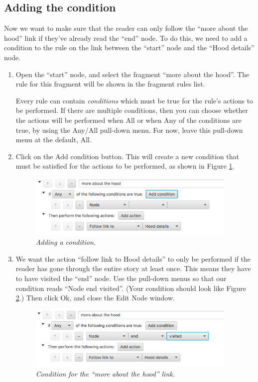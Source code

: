 \documentclass{article}
\begin{document}
\subsection{Adding the condition}

Now we want to make sure that the reader can only follow the ``more about the
hood'' link if they've already read the ``end'' node. To do this, we need to
add a condition to the rule on the link between the ``start'' node and the
``Hood details'' node.

\begin{enumerate}
  \item Open the ``start'' node, and select the fragment ``more about the
  hood''. The rule for this fragment will be shown in the fragment rules list.

Every rule can contain \textit{conditions} which must be true for the rule's actions to be performed. If there are multiple conditions, then you can choose whether the actions will be performed when All or when Any of the conditions are true, by using the Any/All pull-down menu. For now, leave this pull-down menu at the default, All.

\item Click on the Add condition button. This will create a new condition that must be satisfied for the actions to be performed, as shown in Figure \ref{fig:tut1:adding_condition}.
 
\begin{figure}[ht]
  \centering
  \includegraphics[width=10cm]{images/hypedyn-tutorial-1-figure-13}
  \caption{\textit{Adding a condition.}}
  \label{fig:tut1:adding_condition}
\end{figure} 

\item We want the action ``follow link to Hood details'' to only be performed if the reader has gone through the entire story at least once. This means they have to have visited the ``end'' node. Use the pull-down menus so that our condition reads ``Node end visited''. (Your condition should look like Figure \ref{fig:tut1:condition_hood_details}.) Then click Ok, and close the Edit Node window.

\begin{figure}[ht]
  \centering
  \includegraphics[width=10cm]{images/hypedyn-tutorial-1-figure-14}
  \caption{\textit{Condition for the ``more about the hood'' link.}}
  \label{fig:tut1:condition_hood_details}
\end{figure} 


\end{enumerate}
\end{document}
